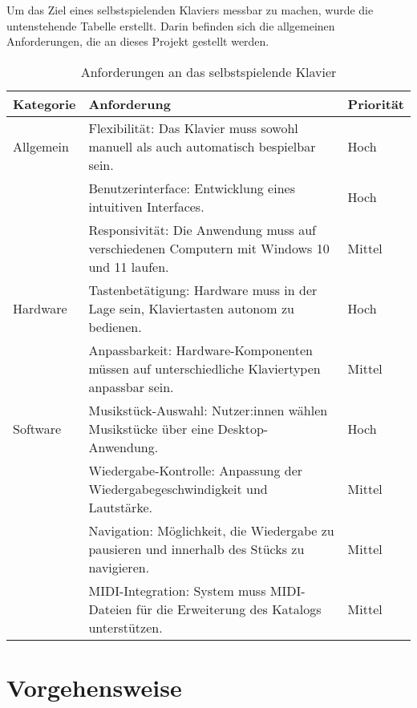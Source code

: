 Um das Ziel eines selbstspielenden Klaviers messbar zu machen, wurde die untenstehende Tabelle erstellt.
Darin befinden sich die allgemeinen Anforderungen, die an dieses Projekt gestellt werden.

\begin{table}[ht]
    \centering
    \begin{tabular}{ | m{2cm} | m{10cm}| m{2cm} | }
        \hline
        \textbf{Kategorie} & \textbf{Anforderung} & \textbf{Priorität} \\
        \hline
        Allgemein & Flexibilität: Das Klavier muss sowohl manuell als auch automatisch bespielbar sein. & Hoch \\
        \cline{2-3}
        & Benutzerinterface: Entwicklung eines intuitiven Interfaces. & Hoch \\
        \cline{2-3}
        & Responsivität: Die Anwendung muss auf verschiedenen Computern mit Windows 10 und 11 laufen. & Mittel \\
        \cline{2-3}
        \hline
        Hardware & Tastenbetätigung: Hardware muss in der Lage sein, Klaviertasten autonom zu bedienen. & Hoch \\
        \cline{2-3}
        & Anpassbarkeit: Hardware-Komponenten müssen auf unterschiedliche Klaviertypen anpassbar sein. & Mittel \\
        \hline
        Software & Musikstück-Auswahl: Nutzer:innen wählen Musikstücke über eine Desktop-Anwendung. & Hoch \\
        \cline{2-3}
        & Wiedergabe-Kontrolle: Anpassung der Wiedergabegeschwindigkeit und Lautstärke. & Mittel \\
        \cline{2-3}
        & Navigation: Möglichkeit, die Wiedergabe zu pausieren und innerhalb des Stücks zu navigieren. & Mittel \\
        \cline{2-3}
        & MIDI-Integration: System muss MIDI-Dateien für die Erweiterung des Katalogs unterstützen. & Mittel \\
        \hline
    \end{tabular}
    \caption{Anforderungen an das selbstspielende Klavier}
    \label{table:anforderungen}
\end{table}


\section{Vorgehensweise} \label{sec:zielstellung-vorgehen}

